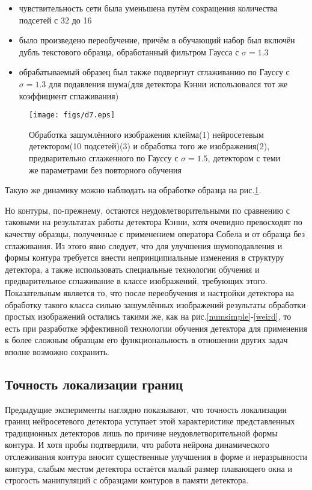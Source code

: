 \documentclass[a4paper,12pt]{report}
\begin{document}
\begin{itemize}
\item{чувствительность сети была уменьшена путём сокращения количества подсетей с 32 до 16}
\item{было произведено переобучение, причём в обучающий набор был включён дубль текстового образца, обработанный фильтром Гаусса с $\sigma=1.3$}
\item{обрабатываемый образец был также подвергнут сглаживанию по Гауссу с $\sigma=1.3$ для подавления шума(для детектора Кэнни использовался тот же коэффициент сглаживания)}
\end{itemize}
\begin{center}
\begin{figure}[h]
\begin{center}
\texttt{[image: figs/d7.eps]}
\end{center}\caption{Обработка зашумлённого изображения клейма(1) нейросетевым детектором(10 подсетей)(3) и обработка того же изображения(2), предварительно сглаженного по Гауссу с $\sigma=1.5$, детектором с теми же параметрами без повторного обучения}
\label{mks2}
\end{figure}
\end{center}
Такую же динамику можно наблюдать на обработке образца на рис.\ref{mks2}.

Но контуры, по-прежнему, остаются неудовлетворительными по сравнению с таковыми на результатах работы детектора Кэнни, хотя очевидно превосходят по качеству образцы, полученные с применением оператора Собела и от образца без сглаживания. Из этого явно следует, что для улучшения шумоподавления и формы контура требуется внести непринципиальные изменения в структуру детектора, а также использовать специальные технологии обучения и предварительное сглаживание в классе изображений, требующих этого. Показательным является то, что после переобучения и настройки детектора на обработку такого класса сильно зашумлённых изображений результаты обработки простых изображений остались такими же, как на рис.\ref{numsimple}-\ref{weird}, то есть при разработке эффективной технологии обучения детектора для применения к более сложным образцам его функциональность в отношении других задач вполне возможно сохранить.

\subsection{Точность локализации границ}
Предыдущие эксперименты наглядно показывают, что точность локализации границ нейросетевого детектора уступает этой характеристике представленных традиционных детекторов лишь по причине неудовлетворительной формы контура. И хотя пробы подтвердили, что работа нейрона динамического отслеживания контура вносит существенные улучшения в форме и неразрывности контура, слабым местом детектора остаётся малый размер плавающего окна и строгость манипуляций с образцами контуров в памяти детектора.
\end{document}
